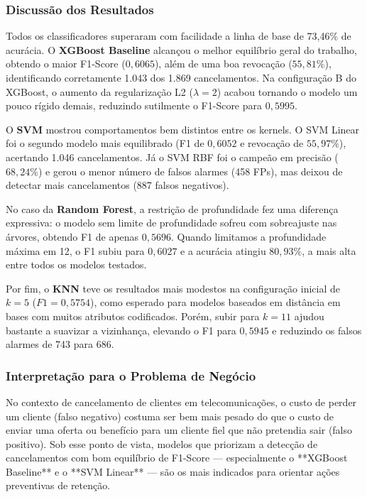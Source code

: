 \subsubsection{Discussão dos Resultados}

Todos os classificadores superaram com facilidade a linha de base de 73,46\% de acurácia. O \textbf{XGBoost Baseline} alcançou o melhor equilíbrio geral do trabalho, obtendo o maior F1-Score ($0{,}6065$), além de uma boa revocação ($55{,}81\%$), identificando corretamente 1.043 dos 1.869 cancelamentos. Na configuração B do XGBoost, o aumento da regularização L2 ($\lambda=2$) acabou tornando o modelo um pouco rígido demais, reduzindo sutilmente o F1-Score para $0{,}5995$.

O \textbf{SVM} mostrou comportamentos bem distintos entre os kernels. O SVM Linear foi o segundo modelo mais equilibrado (F1 de $0{,}6052$ e revocação de $55{,}97\%$), acertando 1.046 cancelamentos. Já o SVM RBF foi o campeão em precisão ($68{,}24\%$) e gerou o menor número de falsos alarmes (458 FPs), mas deixou de detectar mais cancelamentos (887 falsos negativos).

No caso da \textbf{Random Forest}, a restrição de profundidade fez uma diferença expressiva: o modelo sem limite de profundidade sofreu com sobreajuste nas árvores, obtendo F1 de apenas $0{,}5696$. Quando limitamos a profundidade máxima em 12, o F1 subiu para $0{,}6027$ e a acurácia atingiu $80{,}93\%$, a mais alta entre todos os modelos testados.

Por fim, o \textbf{KNN} teve os resultados mais modestos na configuração inicial de $k=5$ ($F1=0{,}5754$), como esperado para modelos baseados em distância em bases com muitos atributos codificados. Porém, subir para $k=11$ ajudou bastante a suavizar a vizinhança, elevando o F1 para $0{,}5945$ e reduzindo os falsos alarmes de 743 para 686.

\subsubsection{Interpretação para o Problema de Negócio}

No contexto de cancelamento de clientes em telecomunicações, o custo de perder um cliente (falso negativo) costuma ser bem mais pesado do que o custo de enviar uma oferta ou benefício para um cliente fiel que não pretendia sair (falso positivo). Sob esse ponto de vista, modelos que priorizam a detecção de cancelamentos com bom equilíbrio de F1-Score — especialmente o **XGBoost Baseline** e o **SVM Linear** — são os mais indicados para orientar ações preventivas de retenção.
